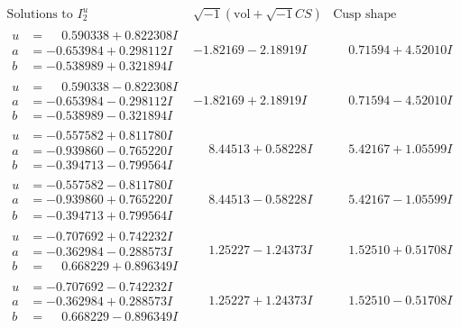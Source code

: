 \documentclass[1p]{elsarticle_modified}
\theoremstyle{definition}
\newcommand{\I}{\sqrt{-1}}
\begin{document}
$$\begin{array}{c|c|c}  
\text{Solutions to }I^u_{2}& \I (\text{vol} + \sqrt{-1}CS) & \text{Cusp shape}\\
 \hline 
\begin{aligned}
u &= \phantom{-}0.590338 + 0.822308 I \\
a &= -0.653984 + 0.298112 I \\
b &= -0.538989 + 0.321894 I\end{aligned}
 & -1.82169 - 2.18919 I & \phantom{-}0.71594 + 4.52010 I \\ \hline\begin{aligned}
u &= \phantom{-}0.590338 - 0.822308 I \\
a &= -0.653984 - 0.298112 I \\
b &= -0.538989 - 0.321894 I\end{aligned}
 & -1.82169 + 2.18919 I & \phantom{-}0.71594 - 4.52010 I \\ \hline\begin{aligned}
u &= -0.557582 + 0.811780 I \\
a &= -0.939860 - 0.765220 I \\
b &= -0.394713 - 0.799564 I\end{aligned}
 & \phantom{-}8.44513 + 0.58228 I & \phantom{-}5.42167 + 1.05599 I \\ \hline\begin{aligned}
u &= -0.557582 - 0.811780 I \\
a &= -0.939860 + 0.765220 I \\
b &= -0.394713 + 0.799564 I\end{aligned}
 & \phantom{-}8.44513 - 0.58228 I & \phantom{-}5.42167 - 1.05599 I \\ \hline\begin{aligned}
u &= -0.707692 + 0.742232 I \\
a &= -0.362984 - 0.288573 I \\
b &= \phantom{-}0.668229 + 0.896349 I\end{aligned}
 & \phantom{-}1.25227 - 1.24373 I & \phantom{-}1.52510 + 0.51708 I \\ \hline\begin{aligned}
u &= -0.707692 - 0.742232 I \\
a &= -0.362984 + 0.288573 I \\
b &= \phantom{-}0.668229 - 0.896349 I\end{aligned}
 & \phantom{-}1.25227 + 1.24373 I & \phantom{-}1.52510 - 0.51708 I \\ \hline\begin{aligned}

\end{aligned}
\end{array}$$
\end{document}
